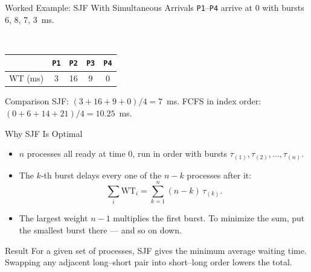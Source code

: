 \documentclass[aspectratio=169]{beamer}
\begin{document}
\begin{frame}{Worked Example: SJF With Simultaneous Arrivals}
  \centering
  \footnotesize
  \texttt{P1}--\texttt{P4} arrive at 0 with bursts 6, 8, 7, 3~ms.\\[0.25cm]
  \\[0.25cm]
  \begin{tabular}{lcccc}
    \toprule
    & \texttt{P1} & \texttt{P2} & \texttt{P3} & \texttt{P4} \\
    \midrule
    WT (ms) & 3 & 16 & 9 & 0 \\
    \bottomrule
  \end{tabular}
  \vspace{0.2cm}
  \begin{exampleblock}{Comparison}
    SJF: $(3+16+9+0)/4 = 7$~ms. FCFS in index order:
    $(0+6+14+21)/4 = 10.25$~ms.
  \end{exampleblock}
\end{frame}

\begin{frame}{Why SJF Is Optimal}
  \begin{itemize}
    \item $n$ processes all ready at time 0, run in order with bursts
      $\tau_{(1)}, \tau_{(2)}, \ldots, \tau_{(n)}$.
    \item The $k$-th burst delays every one of the $n-k$ processes after it:
      \[
        \sum_{i} \mathrm{WT}_i = \sum_{k=1}^{n} (n-k)\,\tau_{(k)} .
      \]
    \item The largest weight $n-1$ multiplies the first burst. To minimize
      the sum, put the smallest burst there --- and so on down.
  \end{itemize}
  \begin{alertblock}{Result}
    For a given set of processes, SJF gives the minimum average waiting
    time. Swapping any adjacent long--short pair into short--long order
    lowers the total.
  \end{alertblock}
\end{frame}
\end{document}
